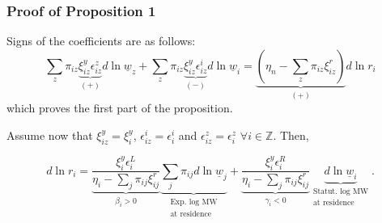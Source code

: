 \begin{frame}
	\frametitle{Proof of Proposition 1}
	
	Signs of the coefficients are as follows:
	$$
	\sum_z \pi_{i z} \underbrace{\xi_{i z}^y \epsilon_{i z}^z }_{(+)} 
		d \ln \underline{w}_z
	+ \sum_z \pi_{i z} \underbrace{\xi_{i z}^y \epsilon_{i z}^i }_{(-)}
		d \ln \underline{w}_i
	= \underbrace{\left(\eta_n - \sum_z \pi_{i z} \xi_{i z}^r \right)}_{(+)} 
		d \ln r_i
	$$
	\vspace{-1mm}
	which proves the first part of the proposition.
	
	\pause
	\vspace{2mm}
	Assume now that $\xi_{i z}^y = \xi_i^y$, $\epsilon_{i z}^i = \epsilon_i^i$ and 
	$\epsilon_{i z}^z = \epsilon_i^z$ $\forall i \in \mathbb{Z}$. Then,
	
	$$
	d \ln r_i
	= \underbrace{\frac{\xi_i^y \epsilon_i^L}
		{\eta_i - \sum_j \pi_{i j} \xi_{i j}^r}}_{\beta_i > 0}
	\underbrace{\sum_j \pi_{i j} d \ln   \underline{w}_j}_{
		\substack{\text{Exp. log MW}\\\text{at residence}}}
	+ \underbrace{\frac{\xi_i^y \epsilon_i^R}
		{\eta_i - \sum_j\pi_{i j}\xi_{i j}^r}}_{\gamma_i < 0}
	\underbrace{d \ln \underline{w}_i}_{
		\substack{\text{Statut. log MW}\\\text{at residence}}} .
	$$
	
	\hyperlink{proof_main}{}
\end{frame}

%	


